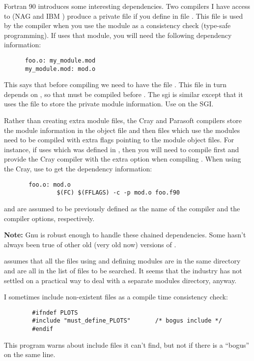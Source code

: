 Fortran 90 introduces some interesting dependencies.  Two compilers I
have access to (NAG  and IBM ) produce a private
 file if you define 
 in file .  This file is used by the
compiler when you use the module as a consistency check (type-safe
programming).  If  uses that module, you will need the
following dependency information:
\begin{verbatim}
      foo.o: my_module.mod
      my_module.mod: mod.o
\end{verbatim}
This says that before compiling  we need to have the file
.  This file in turn depends on , so
that  must be compiled before .
The sgi is similar except that it uses the file 
to store the private module information.  Use 
on the SGI.

Rather than creating extra module files,
the Cray and Parasoft compilers store the module information in the
object file and then files which use the modules need to be compiled
with extra flags pointing to the module object files.  For instance, if
 uses  which was defined in
, then you will need to compile  first and
provide the Cray compiler with the extra option  when
compiling .  When using the Cray, use  to get the dependency information:
\begin{verbatim}
       foo.o: mod.o
               $(FC) $(FFLAGS) -c -p mod.o foo.f90
\end{verbatim}
 and  are assumed to be previously
defined as the name of the compiler and the compiler options,
respectively.

{\bf Note:} Gnu  is robust enough to handle these chained
dependencies. Some hasn't always been true of other old (very old now)
versions of .

 assumes that all the files using and defining
modules are in the same directory and are all in the list of
files to be searched.  It seems that the industry has not
settled on a practical way to deal with a separate modules
directory, anyway.

I sometimes include non-existent files as a compile time
consistency check:
\begin{verbatim}
        #ifndef PLOTS
        #include "must_define_PLOTS"       /* bogus include */
        #endif
\end{verbatim}
This program warns about include files it can't find, but
not if there is a ``bogus'' on the same line.

